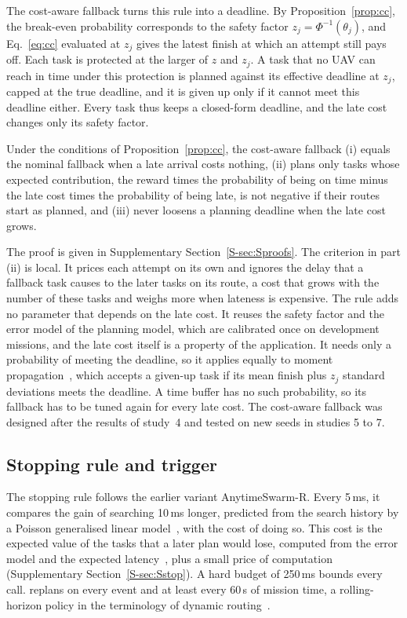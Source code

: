 The cost-aware fallback turns this rule into a deadline. By Proposition~\ref{prop:cc}, the break-even probability
corresponds to the safety factor $z_j=\Phi^{-1}(\theta_j)$, and Eq.~\eqref{eq:cc} evaluated at $z_j$ gives the latest
finish at which an attempt still pays off. Each task is protected at the larger of $z$ and $z_j$. A task that no UAV can
reach in time under this protection is planned against its effective deadline at $z_j$, capped at the true deadline,
and it is given up only if it cannot meet this deadline either. Every task thus keeps a closed-form deadline, and the
late cost changes only its safety factor.

\begin{prop}\label{prop:costfb}
Under the conditions of Proposition~\ref{prop:cc}, the cost-aware fallback (i) equals the nominal fallback when a late
arrival costs nothing, (ii) plans only tasks whose expected contribution, the reward times the probability of being on
time minus the late cost times the probability of being late, is not negative if their routes start as planned, and
(iii) never loosens a planning deadline when the late cost grows.
\end{prop}

The proof is given in Supplementary Section~\ref{S-sec:Sproofs}. The criterion in part (ii) is local. It prices each
attempt on its own and ignores the delay that a fallback task causes to the later tasks on its route, a cost that grows
with the number of these tasks and weighs more when lateness is expensive. The rule adds no parameter that depends on
the late cost. It reuses the safety factor and the error model of the planning model, which are calibrated once on
development missions, and the late cost itself is a property of the application. It needs only a probability
of meeting the deadline, so it applies equally to moment propagation~\cite{ehmke2015ensuring}, which accepts a given-up
task if its mean finish plus $z_j$ standard deviations meets the deadline. A time buffer has no such probability, so its
fallback has to be tuned again for every late cost. The cost-aware fallback was designed after the results of study~4
and tested on new seeds in studies 5 to 7.

\subsection{Stopping rule and trigger}\label{sec:stop}
The stopping rule follows the earlier variant AnytimeSwarm-R. Every 5\,ms, it compares the gain of searching 10\,ms
longer, predicted from the search history by a Poisson generalised linear model~\cite{mccullagh1989glm}, with the cost
of doing so. This cost is the expected value of the tasks that a later plan would lose, computed from the error model
and the expected latency~\cite{savelsbergh1992vrptw}, plus a small price of computation (Supplementary
Section~\ref{S-sec:Sstop}). A hard budget of 250\,ms bounds every call. \mname{} replans on every event and at least
every 60\,s of mission time, a rolling-horizon policy in the terminology of dynamic routing~\cite{soeffker2022review}.
